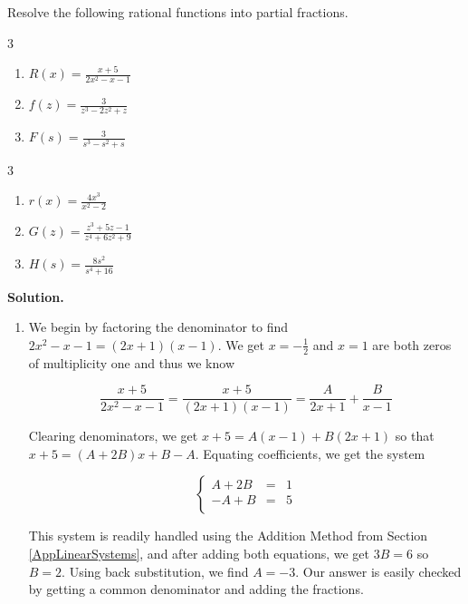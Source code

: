 \documentclass{ximera}
\begin{document}
\begin{example}  Resolve the following rational functions into partial fractions.

\begin{multicols}{3}
\begin{enumerate}

\item  $R(x) = \frac{x+5}{2x^2-x-1}$

\item  $f(z) = \frac{3}{z^3-2z^2+z}$

\item  $F(s) = \frac{3}{s^3-s^2+s}$

\setcounter{HW}{\value{enumi}}
\end{enumerate}
\end{multicols}


\begin{multicols}{3}
\begin{enumerate}
\setcounter{enumi}{\value{HW}}

\item  $r(x) = \frac{4x^3}{x^2-2}$

\item  $G(z) = \frac{z^3+5z-1}{z^4+6z^2+9}$

\item  $H(s) = \frac{8s^2}{s^4+16}$

\end{enumerate}
\end{multicols}
{\bf Solution.}  

\begin{enumerate}

\item  We begin by factoring the denominator to find $2x^2-x-1 = (2x+1)(x-1)$.  We get $x=-\frac{1}{2}$ and $x=1$ are both zeros of multiplicity one and thus we know

\[\frac{x+5}{2x^2-x-1} = \frac{x+5}{(2x+1)(x-1)} = \frac{A}{2x+1} + \frac{B}{x-1}\]

Clearing denominators, we get $x+5 = A(x-1) + B(2x+1)$ so that $x + 5 = (A+2B)x + B-A$.  Equating coefficients, we get the system

\[ \left\{ \begin{array}{rcr}  A+2B & = & 1 \\ -A+B & = & 5 \\ \end{array} \right.\]

This system is readily handled using the Addition Method from Section \ref{AppLinearSystems}, and after adding both equations, we get $3B = 6$ so $B = 2$.  Using back substitution, we find $A = -3$.  Our answer is easily checked by getting a common denominator and adding the fractions.


\end{enumerate}
\end{example}
\end{document}
